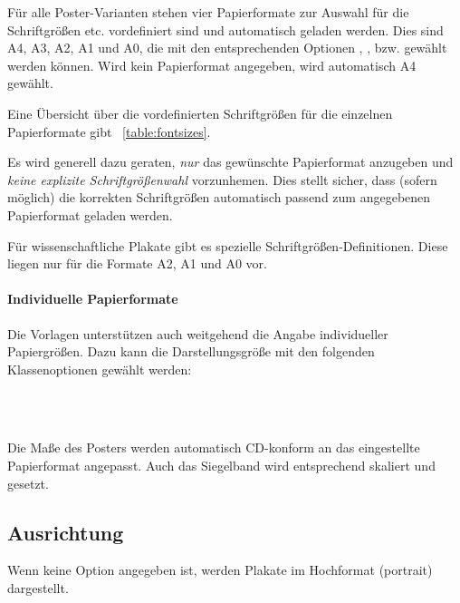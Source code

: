 Für alle Poster-Varianten stehen vier Papierformate zur Auswahl für die
Schriftgrößen etc. vordefiniert sind und automatisch geladen werden.
Dies sind A4, A3, A2, A1 und A0, die mit den entsprechenden Optionen
, ,  bzw. 
gewählt werden können.
Wird kein Papierformat angegeben, wird automatisch A4 gewählt.

Eine Übersicht über die vordefinierten Schriftgrößen für die einzelnen
Papierformate gibt \tablename~\ref{table:fontsizes}.

\begin{hint}
Es wird generell dazu geraten, \emph{nur} das gewünschte Papierformat
anzugeben und \emph{keine explizite Schriftgrößenwahl} vorzunhemen.
Dies stellt sicher, dass (sofern möglich) die korrekten Schriftgrößen
automatisch passend zum angegebenen Papierformat geladen werden.
\end{hint}

\begin{hint}
  Für wissenschaftliche Plakate gibt es spezielle Schriftgrößen-Definitionen.
  Diese liegen nur für die Formate A2, A1 und A0 vor.
\end{hint}

\paragraph{Individuelle Papierformate}

Die Vorlagen unterstützen auch weitgehend die Angabe individueller Papiergrößen.
Dazu kann die Darstellungsgröße mit den folgenden Klassenoptionen
gewählt werden:
\begin{Declaration}
\\
\\
\end{Declaration}

Die Maße des Posters werden automatisch CD-konform an das eingestellte
Papierformat angepasst.
Auch das Siegelband wird entsprechend skaliert und gesetzt. 

\subsection*{Ausrichtung}

Wenn keine Option angegeben ist, werden Plakate im Hochformat (portrait)
dargestellt.


